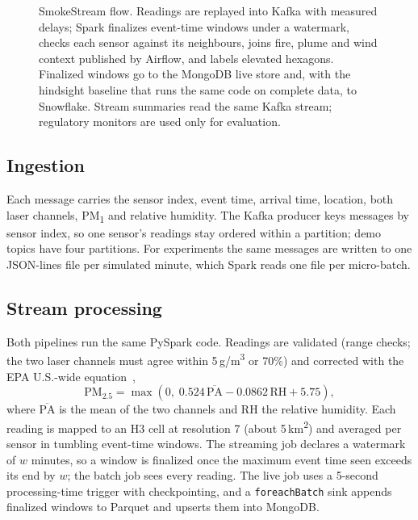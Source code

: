 \documentclass[10pt,journal,compsoc]{IEEEtran}
\newcommand{\ugm}{\,\textmu g/m\textsuperscript{3}}
\begin{document}
\begin{figure}[t]
\caption{SmokeStream flow. Readings are replayed into Kafka with measured delays; Spark finalizes event-time windows under a watermark, checks each sensor against its neighbours, joins fire, plume and wind context published by Airflow, and labels elevated hexagons. Finalized windows go to the MongoDB live store and, with the hindsight baseline that runs the same code on complete data, to Snowflake. Stream summaries read the same Kafka stream; regulatory monitors are used only for evaluation.}
\label{fig:flow}
\end{figure}

\subsection{Ingestion}
Each message carries the sensor index, event time, arrival time, location, both laser channels, PM\textsubscript{1} and relative humidity. The Kafka producer keys messages by sensor index, so one sensor's readings stay ordered within a partition; demo topics have four partitions. For experiments the same messages are written to one JSON-lines file per simulated minute, which Spark reads one file per micro-batch.

\subsection{Stream processing}
Both pipelines run the same PySpark code. Readings are validated (range checks; the two laser channels must agree within 5\ugm{} or 70\%) and corrected with the EPA U.S.-wide equation~\cite{barkjohn2021},
\begin{equation}
\text{PM}_{2.5} = \max\left(0,\; 0.524\,\overline{\text{PA}} - 0.0862\,\text{RH} + 5.75\right),
\end{equation}
where $\overline{\text{PA}}$ is the mean of the two channels and RH the relative humidity. Each reading is mapped to an H3 cell at resolution 7 (about 5\,km\textsuperscript{2}) and averaged per sensor in tumbling event-time windows. The streaming job declares a watermark of $w$ minutes, so a window is finalized once the maximum event time seen exceeds its end by $w$; the batch job sees every reading. The live job uses a 5-second processing-time trigger with checkpointing, and a \texttt{foreachBatch} sink appends finalized windows to Parquet and upserts them into MongoDB.
\end{document}
